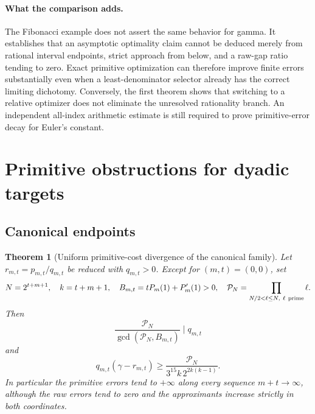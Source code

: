 \documentclass[11pt,a4paper]{article}
\newtheorem{theorem}{Theorem}[section]
\theoremstyle{definition}
\theoremstyle{remark}
\begin{document}
\paragraph{What the comparison adds.}
The Fibonacci example does not assert the same behavior for gamma.
It establishes that an asymptotic optimality claim cannot be deduced
merely from rational interval endpoints, strict approach from below,
and a raw-gap ratio tending to zero. Exact primitive optimization can
therefore improve finite errors substantially even when a
least-denominator selector already has the correct limiting dichotomy.
Conversely, the first theorem shows that switching to a relative
optimizer does not eliminate the unresolved rationality branch.
An independent all-index arithmetic estimate is still required to
prove primitive-error decay for Euler's constant.

\section{Primitive obstructions for dyadic targets}

\subsection{Canonical endpoints}

\begin{theorem}[Uniform primitive-cost divergence of the canonical family]
\label{next-cutoff-cost}
Let $r_{m,t}=p_{m,t}/q_{m,t}$ be reduced with $q_{m,t}>0$.
Except for $(m,t)=(0,0)$, set
\[
 N=2^{t+m+1},\quad k=t+m+1,\quad
 B_{m,t}=tP_m(1)+P_m'(1)>0,\quad
 \mathcal P_N=\prod_{N/2<\ell\le N,\ \ell\ {\rm prime}}\ell.
\]
Then
\begin{equation}\label{next-cutoff-actual-denominator}
 \frac{\mathcal P_N}{\gcd(\mathcal P_N,B_{m,t})}
 \mid q_{m,t}
\end{equation}
and
\begin{equation}\label{next-cutoff-cost-bound}
 q_{m,t}(\gamma-r_{m,t})
 \ge\frac{\mathcal P_N}
 {3^{15}k\,2^{2k(k-1)}}.
\end{equation}
In particular the primitive errors tend to $+\infty$ along every
sequence $m+t\to\infty$, although the raw errors tend to zero and the
approximants increase strictly in both coordinates.
\end{theorem}
\end{document}
